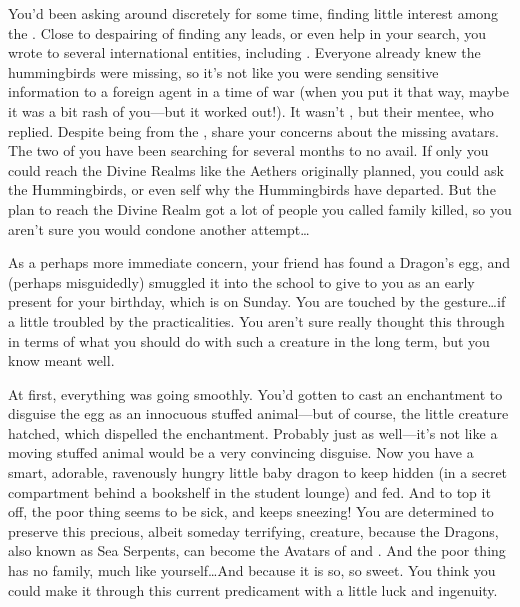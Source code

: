\documentclass[char]{GL2020}
\begin{document}
You'd been asking around discretely for some time, finding little interest among the \pFarm{}. Close to despairing of finding any leads, or even help in your search, you wrote to several international entities, including \cHeadDiplomat{\full}. Everyone already knew the hummingbirds were missing, so it's not like you were sending sensitive information to a foreign agent in a time of war (when you put it that way, maybe it was a bit rash of you---but it worked out!). It wasn't \cHeadDiplomat{}, but their mentee, \cJuniorStatesman{\full} who replied. Despite being from the \pShip{}, \cJuniorStatesman{\they} share\nolinebreak\cJuniorStatesman{\plural} your concerns about the missing avatars. The two of you have been searching for several months to no avail. If only you could reach the Divine Realms like the Aethers originally planned, you could  ask the Hummingbirds, or even \cFarmGod{} \cFarmGod{\them}self why the Hummingbirds have departed. But the plan to reach the Divine Realm got a lot of people you called family killed, so you aren't sure you would condone another attempt\ldots{}
 
As a perhaps more immediate concern, your friend \cPirateChild{} has found a Dragon's egg, and (perhaps misguidedly) smuggled it into the school to give to you as an early present for your birthday, which is on Sunday. You are touched by the gesture\ldots{}if a little troubled by the practicalities. You aren't sure \cPirateChild{} really thought this through in terms of what you should do with such a creature in the long term, but you know \cPirateChild{\they} meant well. 

At first, everything was going smoothly. You'd gotten \cAdopted{} to cast an enchantment to disguise the egg as an innocuous stuffed animal---but of course, the little creature hatched, which dispelled the enchantment. Probably just as well---it's not like a moving stuffed animal would be a very convincing disguise. Now you have a smart, adorable, ravenously hungry little baby dragon to keep hidden (in a secret compartment behind a bookshelf in the student lounge) and fed. And to top it off, the poor thing seems to be sick, and keeps sneezing! You are determined to preserve this precious, albeit someday terrifying, creature, because the Dragons, also known as Sea Serpents, can become the Avatars of \cEbbFull{\full} and \cFlowFull{\full}. And the poor thing has no family, much like yourself\ldots{}And because it is so, so sweet. You think you could make it through this current predicament with a little luck and ingenuity.
\end{document}
